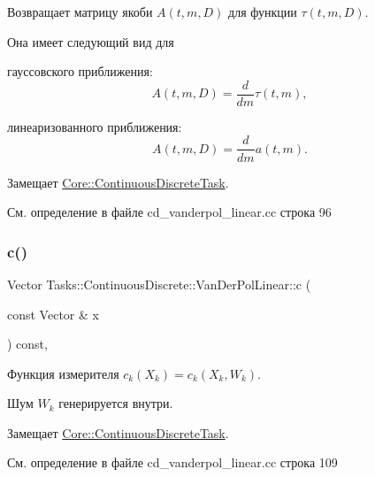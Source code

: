 Возвращает матрицу якоби $A(t, m, D)$ для функции $\tau(t, m, D)$. 

Она имеет следующий вид для


\begin{DoxyItemize}
\item гауссовского приближения\+: \[A(t, m, D) = \frac{d}{dm} \tau(t, m),\]
\item линеаризованного приближения\+: \[A(t, m, D) = \frac{d}{dm} a(t, m).\] 
\end{DoxyItemize}

Замещает \hyperlink{class_core_1_1_continuous_discrete_task_a332d99b61aabb919bffe75d0eec05cfe}{Core\+::\+Continuous\+Discrete\+Task}.



См. определение в файле cd\+\_\+vanderpol\+\_\+linear.\+cc строка 96

\hypertarget{class_tasks_1_1_continuous_discrete_1_1_van_der_pol_linear_af2602ff749602f29f5169ea0e1b391ed}{}\label{class_tasks_1_1_continuous_discrete_1_1_van_der_pol_linear_af2602ff749602f29f5169ea0e1b391ed} 
\subsubsection{\texorpdfstring{c()}{c()}}
{\footnotesize\ttfamily Vector Tasks\+::\+Continuous\+Discrete\+::\+Van\+Der\+Pol\+Linear\+::c (\begin{DoxyParamCaption}\item[{const Vector \&}]{x }\end{DoxyParamCaption}) const\hspace{0.3cm}{\ttfamily [override]}, {\ttfamily [virtual]}}



Функция измерителя $c_k(X_k) = c_k(X_k, W_k)$. 

Шум $W_k$ генерируется внутри. 

Замещает \hyperlink{class_core_1_1_continuous_discrete_task_a64ea27bc1e2a9e6bf1401fc7622c9aea}{Core\+::\+Continuous\+Discrete\+Task}.



См. определение в файле cd\+\_\+vanderpol\+\_\+linear.\+cc строка 109

\hypertarget{class_tasks_1_1_continuous_discrete_1_1_van_der_pol_linear_ac624f91abb5e440d9b05835ca281f53f}{}\label{class_tasks_1_1_continuous_discrete_1_1_van_der_pol_linear_ac624f91abb5e440d9b05835ca281f53f} 
